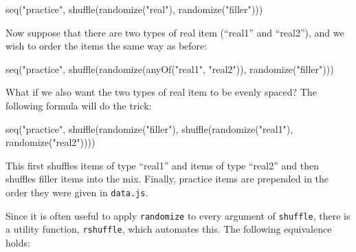 \documentclass[]{article}
\newenvironment{Shaded}{}{}
\newcommand{\StringTok}[1]{\textcolor[rgb]{0.25,0.44,0.63}{{#1}}}
\newcommand{\FunctionTok}[1]{\textcolor[rgb]{0.02,0.16,0.49}{{#1}}}
\newcommand{\NormalTok}[1]{{#1}}
\begin{document}
\begin{Shaded}
\begin{Highlighting}[]
    \FunctionTok{seq}\NormalTok{(}\StringTok{"practice"}\NormalTok{, }\FunctionTok{shuffle}\NormalTok{(}\FunctionTok{randomize}\NormalTok{(}\StringTok{"real"}\NormalTok{), }\FunctionTok{randomize}\NormalTok{(}\StringTok{"filler"}\NormalTok{)))}
\end{Highlighting}
\end{Shaded}

Now suppose that there are two types of real item (``real1'' and
``real2''), and we wish to order the items the same way as before:

\begin{Shaded}
\begin{Highlighting}[]
    \FunctionTok{seq}\NormalTok{(}\StringTok{"practice"}\NormalTok{, }\FunctionTok{shuffle}\NormalTok{(}\FunctionTok{randomize}\NormalTok{(}\FunctionTok{anyOf}\NormalTok{(}\StringTok{"real1"}\NormalTok{, }\StringTok{"real2"}\NormalTok{)),}
                    \FunctionTok{randomize}\NormalTok{(}\StringTok{"filler"}\NormalTok{)))}
\end{Highlighting}
\end{Shaded}

What if we also want the two types of real item to be evenly spaced? The
following formula will do the trick:

\begin{Shaded}
\begin{Highlighting}[]
    \FunctionTok{seq}\NormalTok{(}\StringTok{"practice"}\NormalTok{, }\FunctionTok{shuffle}\NormalTok{(}\FunctionTok{randomize}\NormalTok{(}\StringTok{"filler"}\NormalTok{),}
                            \FunctionTok{shuffle}\NormalTok{(}\FunctionTok{randomize}\NormalTok{(}\StringTok{"real1"}\NormalTok{),}
                                    \FunctionTok{randomize}\NormalTok{(}\StringTok{"real2"}\NormalTok{))))}
\end{Highlighting}
\end{Shaded}

This first shuffles items of type ``real1'' and items of type ``real2''
and then shuffles filler items into the mix. Finally, practice items are
prepended in the order they were given in \texttt{data.js}.

Since it is often useful to apply \texttt{randomize} to every argument
of \texttt{shuffle}, there is a utility function, \texttt{rshuffle},
which automates this. The following equivalence holds:
\end{document}
